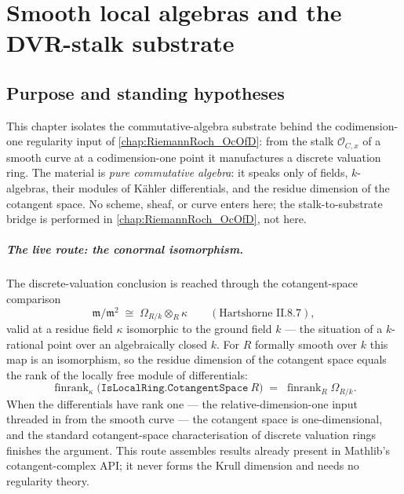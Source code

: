 
\chapter{Smooth local algebras and the DVR-stalk substrate}
\label{chap:RiemannRoch_SmoothRegular}


\section{Purpose and standing hypotheses}

This chapter isolates the commutative-algebra substrate behind the
codimension-one regularity input of \cref{chap:RiemannRoch_OcOfD}: from the
stalk \(\mathcal O_{C, x}\) of a smooth curve at a codimension-one point it
manufactures a discrete valuation ring. The material is \emph{pure
commutative algebra}: it speaks only of fields, \(k\)-algebras, their modules
of K\"ahler differentials, and the residue dimension of the cotangent space.
No scheme, sheaf, or curve enters here; the stalk-to-substrate bridge is
performed in \cref{chap:RiemannRoch_OcOfD}, not here.

\paragraph{The live route: the conormal isomorphism.} The discrete-valuation
conclusion is reached through the cotangent-space comparison
\[
  \mathfrak m / \mathfrak m^2 \;\cong\; \Omega_{R/k} \otimes_R \kappa
  \qquad (\text{Hartshorne~II.8.7}),
\]
valid at a residue field \(\kappa\) isomorphic to the ground field \(k\) ---
the situation of a \(k\)-rational point over an algebraically closed \(k\).
For \(R\) formally smooth over \(k\) this map is an isomorphism, so the
residue dimension of the cotangent space equals the rank of the locally free
module of differentials:
\[
  \operatorname{finrank}_\kappa
    \bigl(\texttt{IsLocalRing.CotangentSpace}\ R\bigr)
  \;=\;
  \operatorname{finrank}_R \Omega_{R/k}.
\]
When the differentials have rank one --- the relative-dimension-one input
threaded in from the smooth curve --- the cotangent space is one-dimensional,
and the standard cotangent-space characterisation of discrete valuation rings
finishes the argument. This route assembles results already present in
Mathlib's cotangent-complex API; it never forms the Krull dimension and needs
no regularity theory.

